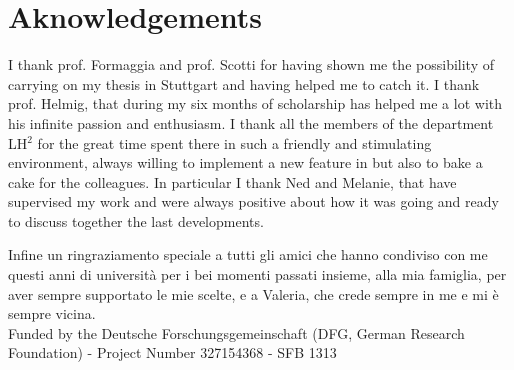 \chapter*{Aknowledgements}
I thank prof. Formaggia and prof. Scotti for having shown me the possibility of carrying on my thesis in Stuttgart and having helped me to catch it.
I thank prof. Helmig, that during my six months of scholarship has helped me a lot with his infinite passion and enthusiasm.
I thank all the members of the department LH$^2$ for the great time spent there in such a friendly and stimulating environment, always willing to implement a new feature in \DUMUX but also to bake a cake for the colleagues. In particular I thank Ned and Melanie, that have supervised my work and were always positive about how it was going and ready to discuss together the last developments.

Infine un ringraziamento speciale a tutti gli amici che hanno condiviso con me questi anni di università per i bei momenti passati insieme, alla mia famiglia, per aver sempre supportato le mie scelte, e a Valeria, che crede sempre in me e mi è sempre vicina.
\\[2\baselineskip]
Funded by the Deutsche Forschungsgemeinschaft (DFG, German Research Foundation) - Project Number 327154368 - SFB 1313